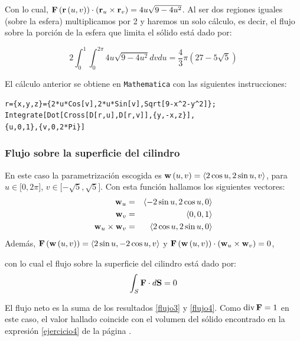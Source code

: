 \begin{parrafonumerado}
Con lo cual, {\small ${\bf F}\left({\bf r}\left(u,v\right)\right) \cdot \left({\bf r}_{u}\times {\bf r}_{v}\right)= 4u\sqrt{9-4u^{2}}$.}
Al ser dos regiones iguales (sobre la esfera) multiplicamos por 2 y haremos un solo cálculo, es decir, el flujo sobre la porción de la esfera que limita el sólido está dado por:

\begin{equation}\label{flujo3}
2\int_{0}^{1}\int_{0}^{2\pi }4u\sqrt{9-4u^{2}}dvdu= \frac{4}{3}\pi \left( 27-5\sqrt{5}\right)
\end{equation}

El cálculo anterior se obtiene en \verb"Mathematica" con las siguientes instrucciones:

\begin{tcolorbox}[title=\bf Instrucción \verb"Mathematica"]\begin{Verbatim}[formatcom=\letraverbatim]
r={x,y,z}={2*u*Cos[v],2*u*Sin[v],Sqrt[9-x^2-y^2]};
Integrate[Dot[Cross[D[r,u],D[r,v]],{y,-x,z}],
{u,0,1},{v,0,2*Pi}]
\end{Verbatim}
\end{tcolorbox}

\subsubsection{Flujo sobre la superficie del cilindro}

En este caso la parametrización escogida es
${\bf w}\left( u,v\right) =\left\langle 2\cos u,2\sin u,v\right\rangle $, para $ u\in \lbrack 0,2\pi ]$, $v\in \lbrack -\sqrt{5},\sqrt{5}]$.
Con esta función hallamos los siguientes vectores:
\begin{eqnarray*}
{\bf w}_{u}&=&\left\langle -2\sin u,2\cos u,0\right\rangle \\
{\bf w}_{v}&=&\left\langle 0,0,1\right\rangle \\
{\bf w}_{u}\times {\bf w}_{v}&=&\left\langle 2\cos u,2\sin u,0\right\rangle
\end{eqnarray*}
Además, ${\bf F}\left( {\bf w}\left( u,v\right) \right) =\left\langle 2\sin u,-2\cos u,v\right\rangle $
y ${\bf F}\left({\bf w}\left( u,v\right) \right) \cdot \left({\bf w}_{u}\times {\bf w}_{v}\right)= 0$,

con lo cual el flujo sobre la superficie del cilindro está dado por:
\begin{equation}\label{flujo4}
\int_S {\bf F}\cdot d{\bf S}=0
\end{equation}

El flujo neto es la suma de los resultados \ref{flujo3} y \ref{flujo4}. Como ${\rm div}\,{\bf F}=1$ en este caso, el valor hallado coincide con el volumen del sólido encontrado en la expresión \ref{ejercicio4} de la página \pageref{ejercicio4}.


\end{parrafonumerado}

